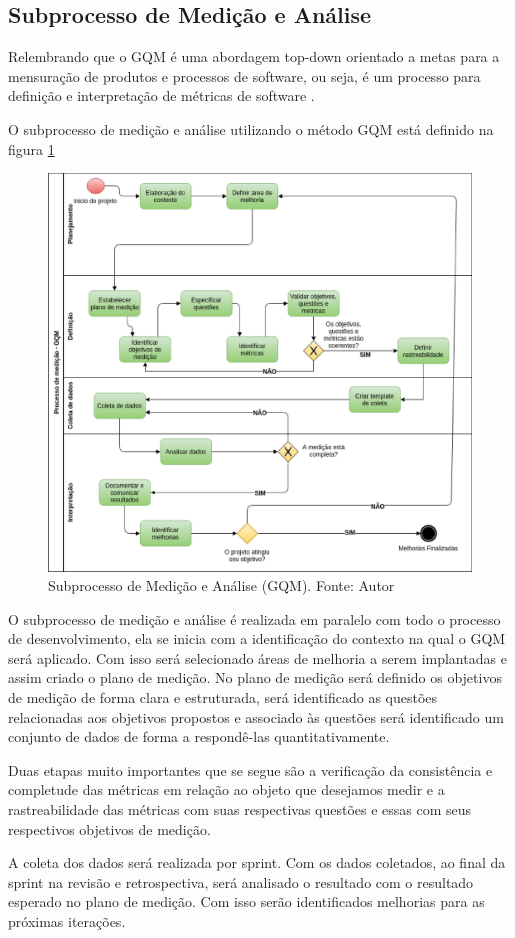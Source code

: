 \subsection{Subprocesso de Medição e Análise}

Relembrando que o GQM é uma abordagem top-down orientado a metas para a mensuração de produtos e processos de software,
ou seja, é um processo para definição e interpretação de métricas de software \cite{junior}.

O subprocesso de medição e análise utilizando o método GQM está definido na figura \ref{fig:gqm}

\begin{figure}[h!]
	\centering
  \includegraphics[keepaspectratio=true,scale=0.5]{figuras/processo_gqm.eps}
  \caption[Subprocesso de Medição e Análise (GQM).]{Subprocesso de Medição e Análise (GQM). Fonte: Autor}
	\label{fig:gqm}
\end{figure}

O subprocesso de medição e análise é realizada em paralelo com todo o processo de desenvolvimento, ela se inicia com a identificação do contexto na qual o GQM será aplicado. Com isso será selecionado áreas de melhoria a serem implantadas e assim criado o plano de medição. No plano de medição será definido os objetivos de medição de forma clara e estruturada, será identificado as questões relacionadas aos objetivos propostos e associado às questões será identificado um conjunto de dados de forma a respondê-las quantitativamente.

Duas etapas muito importantes que se segue são a verificação da consistência e completude das métricas em relação ao objeto que desejamos medir e a rastreabilidade das métricas com suas respectivas questões e essas com seus respectivos objetivos de medição.

A coleta dos dados será realizada por sprint. Com os dados coletados, ao final da sprint na revisão e retrospectiva, será analisado o resultado com o resultado esperado no plano de medição. Com isso serão identificados melhorias para as próximas iterações.
